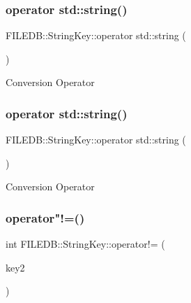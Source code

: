 \subsubsection{\texorpdfstring{operator std::string()}{operator std::string()}\hspace{0.1cm}{\footnotesize\ttfamily [2/3]}}
{\footnotesize\ttfamily F\+I\+L\+E\+D\+B\+::\+String\+Key\+::operator std\+::string (\begin{DoxyParamCaption}\item[{void}]{ }\end{DoxyParamCaption})}

Conversion Operator \mbox{\label{classFILEDB_1_1StringKey_a4ce28a2e70cc35cbf7dd8f7a9424fbb0}} 
\subsubsection{\texorpdfstring{operator std::string()}{operator std::string()}\hspace{0.1cm}{\footnotesize\ttfamily [3/3]}}
{\footnotesize\ttfamily F\+I\+L\+E\+D\+B\+::\+String\+Key\+::operator std\+::string (\begin{DoxyParamCaption}\item[{void}]{ }\end{DoxyParamCaption})}

Conversion Operator \mbox{\label{classFILEDB_1_1StringKey_ad7c210e36fa7438742afa4ed3c66a3df}} 
\subsubsection{\texorpdfstring{operator"!=()}{operator!=()}\hspace{0.1cm}{\footnotesize\ttfamily [1/3]}}
{\footnotesize\ttfamily int F\+I\+L\+E\+D\+B\+::\+String\+Key\+::operator!= (\begin{DoxyParamCaption}\item[{const \mbox{\hyperlink{classFILEDB_1_1StringKey}{String\+Key}} \&}]{key2 }\end{DoxyParamCaption})}

